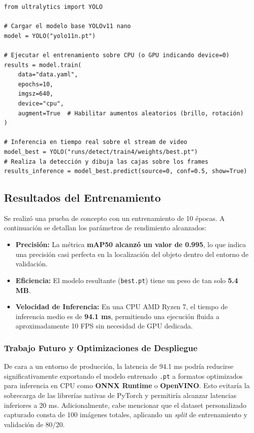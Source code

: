 \documentclass[12pt,a4paper]{article}
\begin{document}
\begin{verbatim}
from ultralytics import YOLO

# Cargar el modelo base YOLOv11 nano
model = YOLO("yolo11n.pt")

# Ejecutar el entrenamiento sobre CPU (o GPU indicando device=0)
results = model.train(
    data="data.yaml",
    epochs=10,
    imgsz=640,
    device="cpu",
    augment=True  # Habilitar aumentos aleatorios (brillo, rotación)
)

# Inferencia en tiempo real sobre el stream de video
model_best = YOLO("runs/detect/train4/weights/best.pt")
# Realiza la detección y dibuja las cajas sobre los frames
results_inference = model_best.predict(source=0, conf=0.5, show=True)
\end{verbatim}

\subsection{Resultados del Entrenamiento}

Se realizó una prueba de concepto con un entrenamiento de 10 épocas. A continuación se detallan los parámetros de rendimiento alcanzados:

\begin{itemize} 
    \item \textbf{Precisión:} La métrica \textbf{mAP50 alcanzó un valor de 0.995}, lo que indica una precisión casi perfecta en la localización del objeto dentro del entorno de validación.
    \item \textbf{Eficiencia:} El modelo resultante (\texttt{best.pt}) tiene un peso de tan solo \textbf{5.4 MB}.
    \item \textbf{Velocidad de Inferencia:} En una CPU AMD Ryzen 7, el tiempo de inferencia medio es de \textbf{94.1 ms}, permitiendo una ejecución fluida a aproximadamente 10 FPS sin necesidad de GPU dedicada.
\end{itemize}

\subsubsection{Trabajo Futuro y Optimizaciones de Despliegue}
De cara a un entorno de producción, la latencia de 94.1 ms podría reducirse significativamente exportando el modelo entrenado \texttt{.pt} a formatos optimizados para inferencia en CPU como \textbf{ONNX Runtime} o \textbf{OpenVINO}. Esto evitaría la sobrecarga de las librerías nativas de PyTorch y permitiría alcanzar latencias inferiores a 20 ms. Adicionalmente, cabe mencionar que el dataset personalizado capturado consta de 100 imágenes totales, aplicando un \textit{split} de entrenamiento y validación de 80/20.
\end{document}
